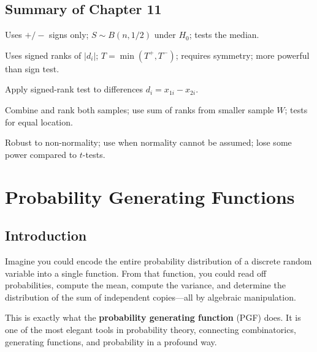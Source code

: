 \documentclass[12pt, a4paper, oneside]{book}
\theoremstyle{definition}
\theoremstyle{plain}
\theoremstyle{remark}
\begin{document}
\section{Summary of Chapter 11}

\begin{summarybox}
\begin{description}[style=nextline]
  \item[Sign test] Uses $+/-$ signs only; $S\sim B(n,1/2)$ under $H_0$;
    tests the median.
  \item[Wilcoxon signed-rank] Uses signed ranks of $|d_i|$; $T=\min(T^+,T^-)$;
    requires symmetry; more powerful than sign test.
  \item[Matched-pairs] Apply signed-rank test to differences $d_i=x_{1i}-x_{2i}$.
  \item[Rank-sum] Combine and rank both samples; use sum of ranks from
    smaller sample $W$; tests for equal location.
  \item[All non-parametric tests] Robust to non-normality; use when normality
    cannot be assumed; lose some power compared to $t$-tests.
\end{description}
\end{summarybox}

\chapter{Probability Generating Functions}
\label{ch:pgf}

\section{Introduction}

Imagine you could encode the entire probability distribution of a discrete
random variable into a single function.  From that function, you could read
off probabilities, compute the mean, compute the variance, and determine the
distribution of the sum of independent copies---all by algebraic
manipulation.

This is exactly what the \textbf{probability generating function} (PGF) does.
It is one of the most elegant tools in probability theory, connecting
combinatorics, generating functions, and probability in a profound way.
\end{document}
